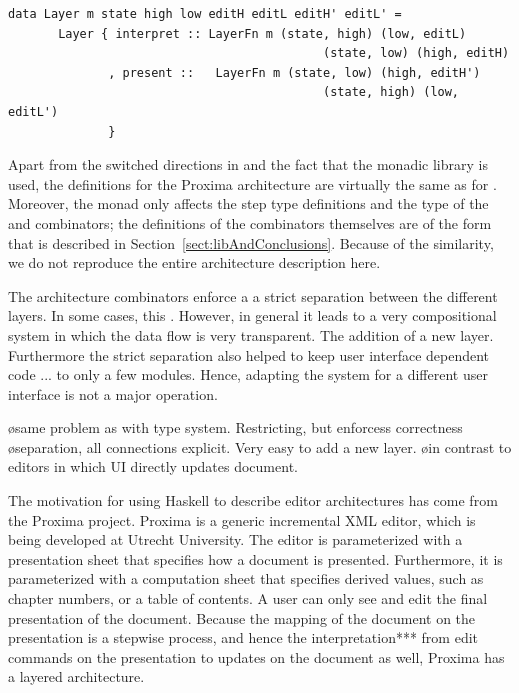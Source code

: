 \documentclass[preprint,natbib]{sigplanconf}
\begin{document}
\begin{small}
\begin{verbatim}
data Layer m state high low editH editL editH' editL' =
       Layer { interpret :: LayerFn m (state, high) (low, editL)
                                            (state, low) (high, editH)
              , present ::   LayerFn m (state, low) (high, editH')
                                            (state, high) (low, editL')
              }
\end{verbatim}
\end{small}

Apart from the switched directions in  and the fact that the monadic library is used, the definitions for the Proxima architecture are virtually the same as for . Moreover, the monad only affects the step type definitions and the type of the  and  combinators; the definitions of the combinators themselves are of the form that is described in Section~\ref{sect:libAndConclusions}. Because of the similarity, we do not reproduce the entire architecture description here.

\ec

\bc
\bigskip

The architecture combinators enforce a a strict separation between the different layers. In some cases, this . However, in general it leads to a very compositional system in which the data flow is very transparent. The addition of a new layer. Furthermore the strict separation also helped to keep user interface dependent code ... to only a few modules. Hence, adapting the system for a different user interface is not a major operation.

\bl
\o same problem as with type system. Restricting, but enforcess correctness
\o separation, all connections explicit. Very easy to add a new layer. 
\o in contrast to editors in which UI directly updates document.
\el
\ec

\bc
The motivation for using Haskell to describe editor architectures has come from the Proxima project. Proxima is a generic incremental XML editor, which is being developed at Utrecht University. The editor is parameterized with a presentation sheet that specifies how a document is presented. Furthermore, it is parameterized with a computation sheet that specifies derived values, such as chapter numbers, or a table of contents. A user can only see and edit the final presentation of the document. Because the mapping of the document on the presentation is a stepwise process, and hence the interpretation*** from edit commands on the presentation to updates on the document as well, Proxima has a layered architecture.
\ec
\end{document}
